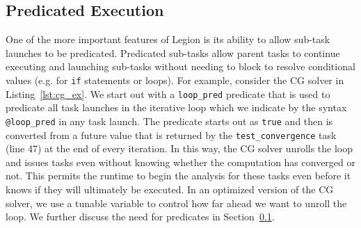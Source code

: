 
\subsection{Predicated Execution}
\label{subsec:speculation}
One of the more important features of Legion
is its ability to allow sub-task launches
to be predicated. Predicated sub-tasks allow
parent tasks to continue executing and
launching sub-tasks without needing to
block to resolve conditional values
(e.g. for {\tt if} statements or loops).
For example, consider the CG solver in
Listing~\ref{lst:cg_ex}. We
start out with a {\tt loop\_pred} predicate
that is used to predicate all task launches
in the iterative loop which we indicate by 
the syntax {\tt @loop\_pred} in any task
launch. The predicate starts out as {\tt true}
and then is converted from a future value 
that is returned by the {\tt test\_convergence}
task (line 47) at the end of every iteration.
In this way, the CG solver unrolls the loop and
issues tasks even without knowing whether
the computation has converged or not. This permits the runtime
to begin the analysis for these tasks even before
it knows if they will ultimately be executed.
In an optimized version of the CG solver, we use
a tunable variable to control how far ahead we
want to unroll the loop. We further discuss the 
need for predicates in Section~\ref{subsec:speculation}.


